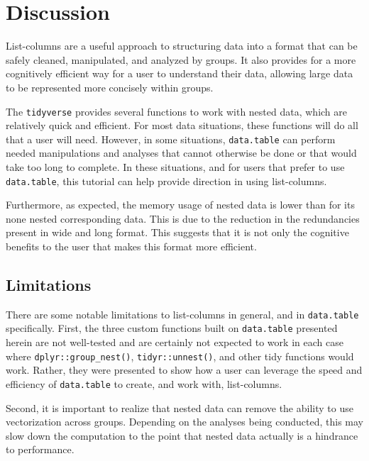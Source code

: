 \documentclass[doc,floatsintext]{apa6}
\begin{document}
\hypertarget{discussion}{%
\section{Discussion}\label{discussion}}

List-columns are a useful approach to structuring data into a format that can be safely cleaned, manipulated, and analyzed by groups. It also provides for a more cognitively efficient way for a user to understand their data, allowing large data to be represented more concisely within groups.

The \texttt{tidyverse} provides several functions to work with nested data, which are relatively quick and efficient. For most data situations, these functions will do all that a user will need. However, in some situations, \texttt{data.table} can perform needed manipulations and analyses that cannot otherwise be done or that would take too long to complete. In these situations, and for users that prefer to use \texttt{data.table}, this tutorial can help provide direction in using list-columns.

Furthermore, as expected, the memory usage of nested data is lower than for its none nested corresponding data. This is due to the reduction in the redundancies present in wide and long format. This suggests that it is not only the cognitive benefits to the user that makes this format more efficient.

\hypertarget{limitations}{%
\subsection{Limitations}\label{limitations}}

There are some notable limitations to list-columns in general, and in \texttt{data.table} specifically. First, the three custom functions built on \texttt{data.table} presented herein are not well-tested and are certainly not expected to work in each case where \texttt{dplyr::group\_nest()}, \texttt{tidyr::unnest()}, and other tidy functions would work. Rather, they were presented to show how a user can leverage the speed and efficiency of \texttt{data.table} to create, and work with, list-columns.

Second, it is important to realize that nested data can remove the ability to use vectorization across groups. Depending on the analyses being conducted, this may slow down the computation to the point that nested data actually is a hindrance to performance.
\end{document}
